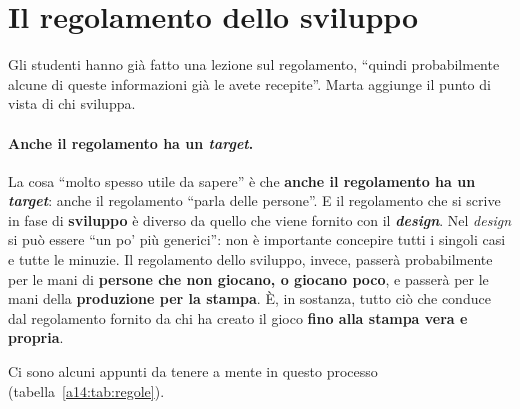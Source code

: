 \section{Il regolamento dello sviluppo}
\label{a14:sec:regolamento}

Gli studenti hanno già fatto una lezione sul regolamento, ``quindi probabilmente alcune di
queste informazioni già le avete recepite''. Marta aggiunge il punto di vista di chi
sviluppa.

\paragraph{Anche il regolamento ha un \emph{target}.} La cosa ``molto spesso utile da
sapere'' è che \textbf{anche il regolamento ha un \emph{target}}: anche il regolamento
``parla delle persone''. E il regolamento che si scrive in fase di \textbf{sviluppo} è
diverso da quello che viene fornito con il \textbf{\emph{design}}. Nel \emph{design} si può
essere ``un po' più generici'': non è importante concepire tutti i singoli casi e tutte le
minuzie. Il regolamento dello sviluppo, invece, passerà probabilmente per le mani di
\textbf{persone che non giocano, o giocano poco}, e passerà per le mani della
\textbf{produzione per la stampa}. È, in sostanza, tutto ciò che conduce dal regolamento
fornito da chi ha creato il gioco \textbf{fino alla stampa vera e propria}.

Ci sono alcuni appunti da tenere a mente in questo processo (tabella~\ref{a14:tab:regole}).

